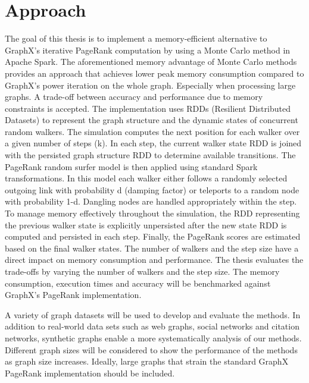 \documentclass[a4paper,12pt]{article}
\begin{document}
\section{Approach}
The goal of this thesis is to implement a memory-efficient alternative to GraphX's iterative PageRank computation by using a Monte Carlo method in Apache Spark. The aforementioned memory advantage of Monte Carlo methods provides an approach that achieves lower peak memory consumption compared to GraphX's power iteration on the whole graph. Especially when processing large graphs. A trade-off between accuracy and performance due to memory constraints is accepted. 
The implementation uses RDDs (Resilient Distributed Datasets) to represent the graph structure and the dynamic states of concurrent random walkers. The simulation computes the next position for each walker over a given number of steps (k). In each step, the current walker state RDD is joined with the persisted graph structure RDD to determine available transitions. The PageRank random surfer model is then applied using standard Spark transformations. In this model each walker either follows a randomly selected outgoing link with probability d (damping factor) or teleports to a random node with probability 1-d. Dangling nodes are handled appropriately within the step. To manage memory effectively throughout the simulation, the RDD representing the previous walker state is explicitly unpersisted after the new state RDD is computed and persisted in each step. Finally, the PageRank scores are estimated based on the final walker states. The number of walkers and the step size have a direct impact on memory consumption and performance. The thesis evaluates the trade-offs by varying the number of walkers and the step size. The memory consumption, execution times and accuracy will be benchmarked against GraphX's PageRank implementation. \par
A variety of graph datasets will be used to develop and evaluate the methods. In addition to real-world data sets such as web graphs, social networks and citation networks, synthetic graphs enable a more systematically analysis of our methods. Different graph sizes will be considered to show the performance of the methods as graph size increases. Ideally, large graphs that strain the standard GraphX PageRank implementation should be included. 




\end{document}
